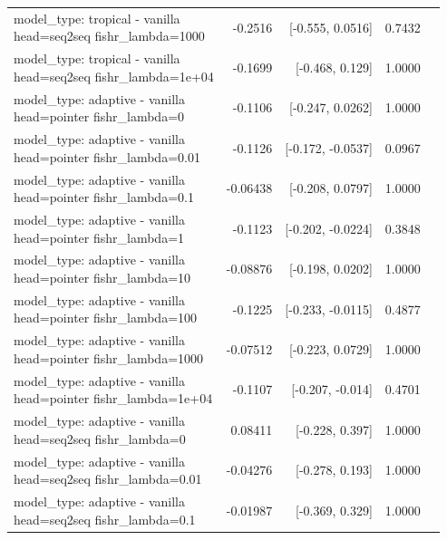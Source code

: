 \documentclass[10pt]{article}
\makeatletter
\newcommand{\stackcell}[1]{\begin{tabular}[t]{@{}l@{}}#1\end{tabular}}
\makeatother
\begin{document}
{\begin{longtable}{lrrrl}
\stackcell{model\_type: tropical - vanilla\\\footnotesize head=seq2seq fishr\_lambda=1000 } & -0.2516 & [-0.555, 0.0516] & 0.7432 & \\
\stackcell{model\_type: tropical - vanilla\\\footnotesize head=seq2seq fishr\_lambda=1e+04 } & -0.1699 & [-0.468, 0.129] & 1.0000 & \\
\stackcell{model\_type: adaptive - vanilla\\\footnotesize head=pointer fishr\_lambda=0 } & -0.1106 & [-0.247, 0.0262] & 1.0000 & \\
\stackcell{model\_type: adaptive - vanilla\\\footnotesize head=pointer fishr\_lambda=0.01 } & -0.1126 & [-0.172, -0.0537] & 0.0967 & \\
\stackcell{model\_type: adaptive - vanilla\\\footnotesize head=pointer fishr\_lambda=0.1 } & -0.06438 & [-0.208, 0.0797] & 1.0000 & \\
\stackcell{model\_type: adaptive - vanilla\\\footnotesize head=pointer fishr\_lambda=1 } & -0.1123 & [-0.202, -0.0224] & 0.3848 & \\
\stackcell{model\_type: adaptive - vanilla\\\footnotesize head=pointer fishr\_lambda=10 } & -0.08876 & [-0.198, 0.0202] & 1.0000 & \\
\stackcell{model\_type: adaptive - vanilla\\\footnotesize head=pointer fishr\_lambda=100 } & -0.1225 & [-0.233, -0.0115] & 0.4877 & \\
\stackcell{model\_type: adaptive - vanilla\\\footnotesize head=pointer fishr\_lambda=1000 } & -0.07512 & [-0.223, 0.0729] & 1.0000 & \\
\stackcell{model\_type: adaptive - vanilla\\\footnotesize head=pointer fishr\_lambda=1e+04 } & -0.1107 & [-0.207, -0.014] & 0.4701 & \\
\stackcell{model\_type: adaptive - vanilla\\\footnotesize head=seq2seq fishr\_lambda=0 } & 0.08411 & [-0.228, 0.397] & 1.0000 & \\
\stackcell{model\_type: adaptive - vanilla\\\footnotesize head=seq2seq fishr\_lambda=0.01 } & -0.04276 & [-0.278, 0.193] & 1.0000 & \\
\stackcell{model\_type: adaptive - vanilla\\\footnotesize head=seq2seq fishr\_lambda=0.1 } & -0.01987 & [-0.369, 0.329] & 1.0000 & \\

\end{longtable}}
\end{document}
